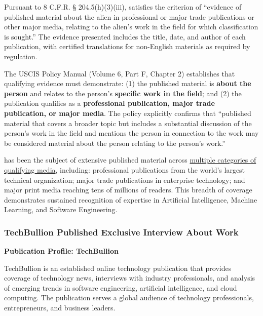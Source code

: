 

Pursuant to 8 C.F.R. § 204.5(h)(3)(iii), \dr satisfies the criterion of ``evidence of published material about the alien in professional or major trade publications or other major media, relating to the alien's work in the field for which classification is sought.'' The evidence presented includes the title, date, and author of each publication, with certified translations for non-English materials as required by regulation.

The USCIS Policy Manual (Volume 6, Part F, Chapter 2) establishes that qualifying evidence must demonstrate: (1) the published material is \textbf{about the person} and relates to the person's \textbf{specific work in the field}; and (2) the publication qualifies as a \textbf{professional publication, major trade publication, or major media}. The policy explicitly confirms that ``published material that covers a broader topic but includes a substantial discussion of the person's work in the field and mentions the person in connection to the work may be considered material about the person relating to the person's work.''

\dr has been the subject of extensive published material across \underline{multiple categories of qualifying media}, including: professional publications from the world's largest technical organization; major trade publications in enterprise technology; and major print media reaching tens of millions of readers. This breadth of coverage demonstrates sustained recognition of \drs expertise in Artificial Intelligence, Machine Learning, and Software Engineering.


\subsubsection{TechBullion Published Exclusive Interview About \drs Work}
\label{media:techbullion}

\textbf{Publication Profile: TechBullion}

TechBullion is an established online technology publication that provides coverage of technology news, interviews with industry professionals, and analysis of emerging trends in software engineering, artificial intelligence, and cloud computing. The publication serves a global audience of technology professionals, entrepreneurs, and business leaders.


